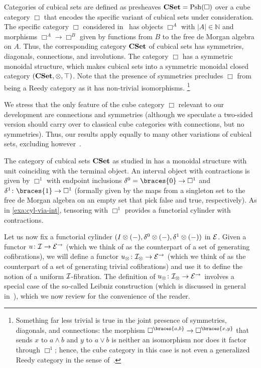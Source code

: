 \documentclass[reqno,10pt,a4paper,oneside,draft]{amsart}
\begin{document}
\begin{example} \label{exa:cyl-in-cuset}
Categories of cubical sets are defined as presheaves $\CSet = \Psh(\Box)$ over a cube category $\Box$ that encodes the specific variant of cubical sets under consideration.
The specific category $\Box$ considered in~\cite{cohen-et-al:cubicaltt} has objects $\Box^A$ with $|A| \in \mathbb{N}$ and morphisms $\Box^A \to \Box^B$ given by functions from $B$ to the free de Morgan algebra on $A$.
Thus, the corresponding category $\CSet$ of cubical sets has symmetries, diagonals, connections, and involutions.
The category $\Box$ has a symmetric monoidal structure, which makes cubical sets into a symmetric monoidal closed category $(\CSet, \otimes, \top)$.
Note that the presence of symmetries precludes $\Box$ from being a Reedy category as it has non-trivial isomorphisms.%
\footnote{
Something far less trivial is true in the joint presence of symmetries, diagonals, and connections: the morphism $\Box^{\braces{a, b}} \to \Box^{\braces{x, y}}$ that sends $x$ to $a \wedge b$ and $y$ to $a \vee b$ is neither an isomorphism nor does it factor through $\Box^1$; hence, the cube category in this case is not even a generalized Reedy category in the sense of~\cite{berger-moerdijk:generalized-reedy}.
}

We stress that the only feature of the cube category $\Box$ relevant to our development are connections and symmetries (although we speculate a two-sided version should carry over to classical cube categories with connections, but no symmetries).
Thus, our results apply equally to many other variations of cubical sets, excluding however~\cite{coquand-cubical-sets,huber-thesis}.

The category of cubical sets $\CSet$ as studied in \cite{cohen-et-al:cubicaltt} has a monoidal structure with unit coinciding with the terminal object.
An interval object with contractions is given by $\Box^1$ with endpoint inclusions $\lcyl = \braces{0} \to \Box^1$ and $\rcyl \co \braces{1} \to \Box^1$ (formally given by the maps from a singleton set to the free de Morgan algebra on an empty set that pick false and true, respectively).
As in \cref{exa:cyl-via-int}, tensoring with $\Box^1$ provides a functorial cylinder with contractions.
\end{example}




Let us now fix a functorial cylinder $(\interval \otimes (-), \lcyl \otimes (-), \rcyl \otimes (-))$ in $\calE$.
Given a functor $u \co \cal{I} \to \catE^\to$ (which we think of as the counterpart of a set of generating cofibrations), we will define a functor $u_\otimes \co \cal{I}_\otimes \to \catE^\to$ (which we think of as the counterpart of a set of generating trivial cofibrations) and use it to define the notion of a uniform $\cal{I}$-fibration.
The definition of $u_\otimes \co \cal{I}_\otimes \to \catE^\to$ involves a special case of the so-called Leibniz construction (which is discussed in general in~\cite{riehl-verity:reedy}), which we now review for the convenience of the reader.
\end{document}
